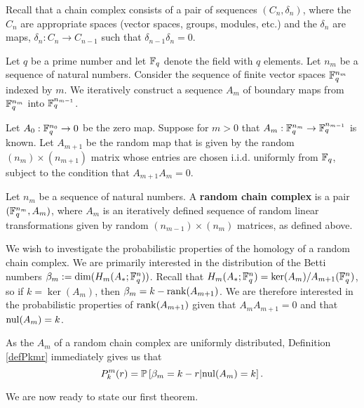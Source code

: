 Recall that a chain complex consists of a pair of sequences $(C_n, \delta_n)$,
where the $C_n$ are appropriate spaces (vector spaces, groups, modules, etc.)
and the $\delta_n$ are maps, $\delta_n: C_n \to C_{n-1}$ such that
$\delta_{n-1}\delta_n = 0$.  

Let $q$ be a prime number and let $\mathbb{F}_q$ denote the field with $q$ elements. Let
$n_m$ be a sequence of natural numbers. Consider the sequence of finite vector
spaces $\mathbb{F}_q^{n_m}$ indexed by $m$.  We iteratively construct a sequence $A_m$
of boundary maps from $\mathbb{F}_q^{n_m}$ into $\mathbb{F}_q^{n_{m-1}}$.

Let $A_0:\mathbb{F}_q^{n_0} \to 0$ be the zero map. Suppose for $m>0$ that
$A_{m}:\mathbb{F}_q^{n_m} \to \mathbb{F}_q^{n_{m-1}}$ is known. Let $A_{m+1}$ be the random map
that is given by the random $(n_{m})\times (n_{m+1})$ matrix whose entries are
chosen i.i.d. uniformly from $\mathbb{F}_q$, subject to the condition that $A_{m+1}A_{m}
= 0$.

\begin{definition} 
  \label{defn:random_chain_cx}
  Let $n_m$ be a sequence of natural numbers. A \textbf{random chain complex}
  is a pair $(\mathbb{F}_q^{n_m},A_m)$, where $A_m$ is an iteratively defined sequence
  of random linear transformations given by random $(n_{m-1})\times (n_m)$
  matrices, as defined above.
\end{definition}

We wish to investigate the probabilistic properties of the homology of a random
chain complex.  We are primarily interested in the distribution of the Betti
numbers $\beta_m := \dim(H_m(A_\ast; \mathbb{F}_q^{n}))$.  Recall that
$H_m(A_\ast;\mathbb{F}_q^{n}) = \ker (A_{m})/ A_{m+1}(\mathbb{F}_q^{n})$, so if $k= \ker(A_m)$,
then $\beta_m = k - \operatorname{\mathrm{rank}}(A_{m+1})$.  We are therefore interested in the
probabilistic properties of $\operatorname{\mathrm{rank}}(A_{m+1})$ given that $A_{m}A_{m+1} = 0$ and
that $\mathrm{nul}(A_{m}) = k$. 


\begin{remark}
As the $A_m$ of a random chain complex are uniformly distributed, Definition
\ref{defPkmr} immediately gives us that
\[
  P^m_k(r) = \mathbb{P}\left[\beta_m = k-r | \mathrm{nul}(A_{m}) = k\right].
\]
\end{remark}



We are now ready to state our first theorem.


